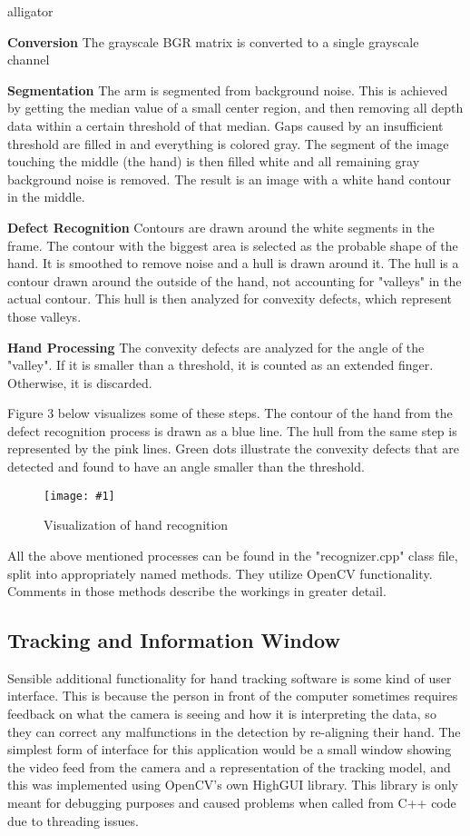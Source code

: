\documentclass[BSA,Bachelor,english]{twbook}%
\newcommand{\stdgraphicnosrc}[2]{\begin{figure}[h]\caption{#2}\centering\texttt{[image: \#1]}\end{figure}}
\begin{document}
\begin{labeling}{alligator}
	\item [\textbf{Conversion}] The grayscale BGR matrix is converted to a single grayscale channel
	\item [\textbf{Segmentation}] The arm is segmented from background noise. This is achieved by getting the median value of a small center region, and then removing all depth data within a certain threshold of that median. Gaps caused by an insufficient threshold are filled in and everything is colored gray. The segment of the image touching the middle (the hand) is then filled white and all remaining gray background noise is removed. The result is an image with a white hand contour in the middle.
	\item [\textbf{Defect Recognition}] Contours are drawn around the white segments in the frame. The contour with the biggest area is selected as the probable shape of the hand. It is smoothed to remove noise and a hull is drawn around it. The hull is a contour drawn around the outside of the hand, not accounting for "valleys" in the actual contour. This hull is then analyzed for convexity defects, which represent those valleys.
	\item [\textbf{Hand Processing}] The convexity defects are analyzed for the angle of the "valley". If it is smaller than a threshold, it is counted as an extended finger. Otherwise, it is discarded.
\end{labeling}

Figure 3 below visualizes some of these steps. The contour of the hand from the defect recognition process is drawn as a blue line. The hull from the same step is represented by the pink lines. Green dots illustrate the convexity defects that are detected and found to have an angle smaller than the threshold.

\stdgraphicnosrc{img/recognition-model.png}{Visualization of hand recognition}

All the above mentioned processes can be found in the "recognizer.cpp" class file, split into appropriately named methods. They utilize OpenCV functionality. Comments in those methods describe the workings in greater detail.

\subsection{Tracking and Information Window}

Sensible additional functionality for hand tracking software is some kind of user interface. This is because the person in front of the computer sometimes requires feedback on what the camera is seeing and how it is interpreting the data, so they can correct any malfunctions in the detection by re-aligning their hand. The simplest form of interface for this application would be a small window showing the video feed from the camera and a representation of the tracking model, and this was implemented using OpenCV's own HighGUI library. This library is only meant for debugging purposes and caused problems when called from C++ code due to threading issues.
\end{document}
